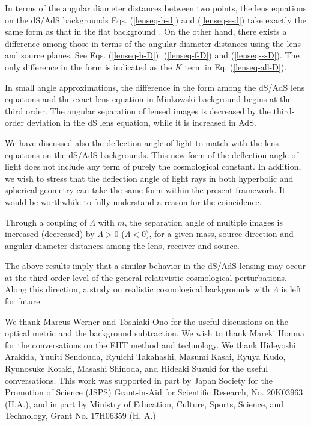 \documentclass[twocolumn,showpacs,preprintnumbers,amsmath,amssymb]{revtex4-1}
\begin{document}
In terms of the angular diameter distances between two points, 
the lens equations on the dS/AdS backgrounds 
Eqs. (\ref{lenseq-h-d}) and (\ref{lenseq-s-d})
take exactly the same form as that in the flat background 
\cite{Takizawa2020b}. 
On the other hand, 
there exists a difference among those 
in terms of the angular diameter distances 
using the lens and source planes. 
See Eqs. (\ref{lenseq-h-D}), (\ref{lenseq-f-D}) and (\ref{lenseq-s-D}). 
The only difference in the form is indicated as 
the $K$ term in Eq. (\ref{lenseq-all-D}). 

In small angle approximations, 
the difference in the form among the dS/AdS lens equations 
and the exact lens equation in Minkowski background 
begins at the third order. 
The angular separation of lensed images is 
decreased by the third-order deviation in the dS lens equation, 
while it is increased in AdS. 

We have discussed also the deflection angle of light to match with 
the lens equations on the dS/AdS backgrounds. 
This new form of the deflection angle of light 
does not include any term of purely the cosmological constant.  
In addition, 
we wish to stress that 
the deflection angle of light rays 
in both hyperbolic and spherical geometry 
can take the same form within the present framework. 
It would be worthwhile to fully understand a reason for the coincidence. 

Through a coupling of $\Lambda$ with $m$, 
the separation angle of multiple images 
is increased (decreased) by $\Lambda > 0$ ($\Lambda < 0$), 
for a given mass, source direction and angular diameter distances 
among the lens, receiver and source.


The above results imply that 
a similar behavior in the dS/AdS lensing may occur 
at the third order level 
of the general relativistic cosmological perturbations. 
Along this direction, a study on realistic cosmological backgrounds 
with $\Lambda$ is left for future. 





\begin{acknowledgments}
We thank Marcus Werner and Toshiaki Ono for the useful discussions 
on the optical metric and the background subtraction. 
We wish to thank Mareki Honma for the conversations 
on the EHT method and technology. 
We thank Hideyoshi Arakida, Yuuiti Sendouda, Ryuichi Takahashi, 
Masumi Kasai,  Ryuya Kudo, 
Ryunosuke Kotaki, Masashi Shinoda, and  Hideaki Suzuki 
for the useful conversations. 
This work was supported 
in part by Japan Society for the Promotion of Science (JSPS) 
Grant-in-Aid for Scientific Research, 
No. 20K03963 (H.A.), 
and 
in part by Ministry of Education, Culture, Sports, Science, and Technology, 
Grant No. 17H06359 (H. A.) 
\end{acknowledgments}
\end{document}
